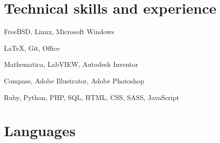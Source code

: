 \documentclass[10pt,letter]{moderncv}
\begin{document}
  \section{Technical skills and experience}

    {FreeBSD, Linux, Microsoft Windows}

    {\LaTeX, Git, Office}

    {Mathematica, LabVIEW, Autodesk Inventor}

    {Compass, Adobe Illustrator, Adobe Photoshop}

    {Ruby, Python, PHP, SQL, HTML, CSS, SASS, JavaScript}

  \section{Languages}

\end{document}
